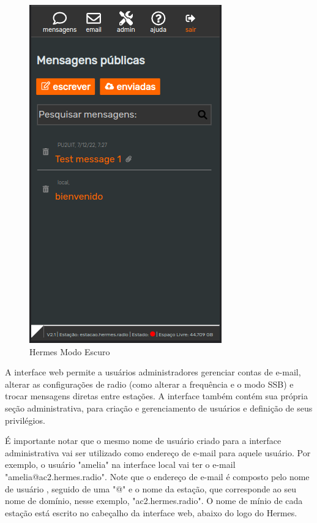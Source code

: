 \documentclass[11pt,a4paper]{article}
\begin{document}
\begin{figure}[H]
    \centering
    \includegraphics[width=0.5\columnwidth]{screenshots/frontend/pt_kn/darkmode.png}
    \caption{Hermes Modo Escuro}
    \label{fig:darkmode}
\end{figure}

A interface web permite a usuários administradores gerenciar contas de e-mail, alterar as configurações de radio (como alterar a frequência e o modo SSB) e trocar mensagens diretas entre estações. A interface também contém sua própria seção administrativa, para criação e gerenciamento de usuários e definição de seus privilégios.     

É importante notar que o mesmo nome de usuário criado para a interface administrativa vai ser utilizado como endereço de e-mail para aquele usuário. Por exemplo, o usuário "amelia" na interface local vai ter o e-mail "amelia@ac2.hermes.radio". Note que o endereço de e-mail é composto pelo nome de usuário , seguido de uma "@" e o nome da estação, que corresponde ao seu nome de domínio, nesse exemplo, "ac2.hermes.radio". O nome de mínio de cada estação está escrito no cabeçalho da interface web, abaixo do logo do Hermes. 
\end{document}
